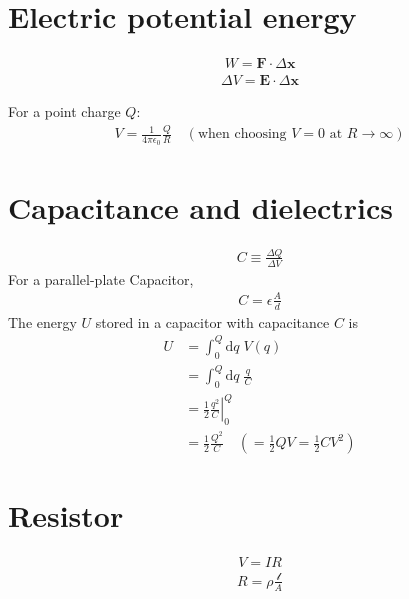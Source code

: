 \documentclass[../book.tex]{subfiles}
\begin{document}
\section{Electric potential energy}
\begin{align}
    W = \mathbf{F} \cdot \Delta \mathbf{ x}
\end{align}
\begin{align}
    \Delta V = \mathbf{E} \cdot \Delta \mathbf{ x}
\end{align}

For a point charge $Q$:
\begin{align}
    V =
    \frac{1}{4 \pi \epsilon_0}
    \frac{Q}{R}
    \quad
    (\text{when choosing $V=0$ at $R \rightarrow \infty$})
\end{align}


\section{Capacitance and dielectrics}
\begin{align}
    C \equiv
    \frac{\Delta Q}{\Delta V}
\end{align}
For a parallel-plate Capacitor,
\begin{align}
    C =
    \epsilon
    \frac{A}{d}
\end{align}
The energy $U$ stored in a capacitor with capacitance $C$ is
\begin{align}
    U
    &=
    \int_0^Q
    \mathrm{d} q \;
    V(q)
    \\
    &=
    \int_0^Q
    \mathrm{d} q \;
    \frac{q}{C}
    \\
    &=
    \frac{1}{2}
    \left.\frac{q^2}{C} \right\vert_0^Q
    \\
    &=
    \frac{1}{2}
    \frac{Q^2}{C}
    \quad
    (=
    \frac{1}{2}
    Q V
    =
    \frac{1}{2}
    C V^2
    )
\end{align}


\section{Resistor}
\begin{align}
    V = I R
\end{align}
\begin{align}
    R = \rho \frac{\mathcal{l}}{A}
\end{align}

\chapterbib
\end{document}
